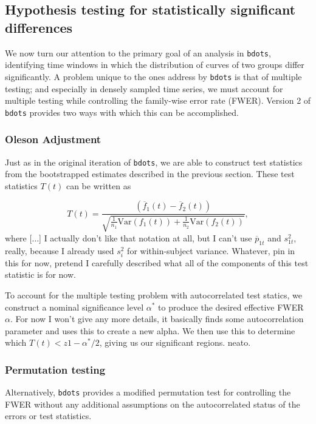\documentclass{article}
\newcommand{\xt}{\texttt}%
\begin{document}
\subsection{Hypothesis testing for statistically significant differences}

We now turn our attention to the primary goal of an analysis in \xt{bdots}, identifying time windows in which the distribution of curves of two groups differ significantly. A problem unique to the ones address by \xt{bdots} is that of multiple testing; and especially in densely sampled time series, we must account for multiple testing while controlling the family-wise error rate (FWER). Version 2 of \xt{bdots} provides two ways with which this can be accomplished.

\subsubsection{Oleson Adjustment}

Just as in the original iteration of \xt{bdots}, we are able to construct test statistics from the bootstrapped estimates described in the previous section. These test statistics $T(t)$ can be written as 

\begin{equation}\label{eq:test_statistic}
T(t) = \frac{(\overline{f}_{1}(t) - \overline{f}_{2}(t))}{\sqrt{\frac{1}{n_1} \text{Var}(f_1(t)) + \frac{1}{n_2} \text{Var}(f_2(t))}},
\end{equation}
where [$\dots$] I actually don't like that notation at all, but I can't use $\overline{p}_{1t}$ and $s_{1t}^2$, really, because I already used $s_i^2$ for within-subject variance. Whatever, pin in this for now, pretend I carefully described what all of the components of this test statistic is for now.

To account for the multiple testing problem with autocorrelated test statics, we construct a nominal significance level $\alpha^*$ to produce the desired effective FWER $\alpha$. For now I won't give any more details, it basically finds some autocorrelation parameter and uses this to create a new alpha.  We then use this to determine which $T(t) < z{1 -\alpha^*/2}$, giving us our significant regions. neato.

\subsubsection{Permutation testing}

Alternatively, \xt{bdots} provides a modified permutation test for controlling the FWER without any additional assumptions on the autocorrelated status of the errors or test statistics. 
\end{document}
